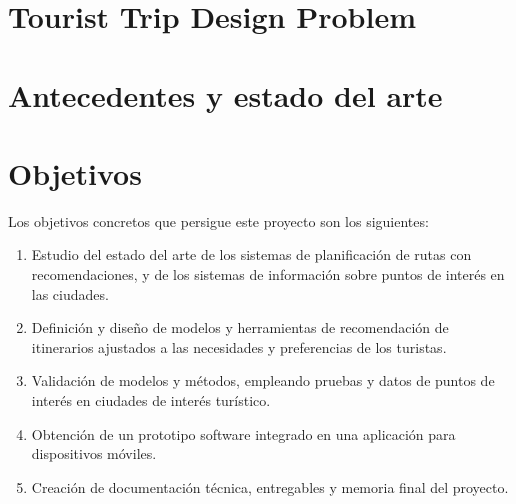 \section[Tourist Trip Design Problem]{Tourist Trip Design Problem}
\section[Antecedentes y estado del arte]{Antecedentes y estado del arte}
\section[Objectivos]{Objetivos}
Los objetivos concretos que persigue este proyecto son los siguientes:
\begin{enumerate}
	\item Estudio del estado del arte de los sistemas de planificación de rutas con recomendaciones, y de los sistemas de información sobre puntos de interés en las ciudades.
	\item Definición y diseño de modelos y herramientas de recomendación de itinerarios ajustados a las necesidades y preferencias de los turistas.
	\item Validación de modelos y métodos, empleando pruebas y datos de puntos de interés en ciudades de interés turístico.
	\item Obtención de un prototipo software integrado en una aplicación para dispositivos móviles.
	\item Creación de documentación técnica, entregables y memoria final del proyecto.
\end{enumerate}
	
	

